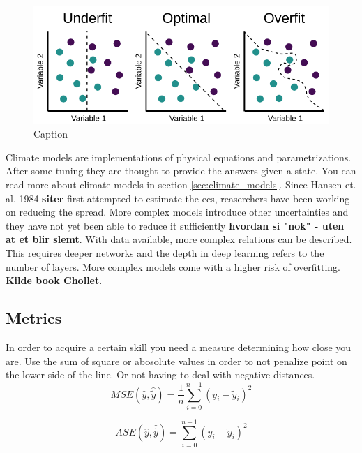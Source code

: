 



\begin{figure}
    \centering
    \includegraphics{Chapter2_Theory/images/classification_overfitted.png}
    \caption{Caption}
    \label{fig:classification_overfitting}
\end{figure}

Climate models are implementations of physical equations and parametrizations. After some tuning they are thought to provide the answers given a state. You can read more about climate models in section \ref{sec:climate_models}. Since Hansen et. al. 1984 \textbf{siter} first attempted to estimate the \acrfull{ecs}, reaserchers have been working on reducing the spread. 
More complex models introduce other uncertainties and they have not yet been able to reduce it sufficiently \textbf{hvordan si "nok" - uten at et blir slemt}. With data available, more complex relations can be described. This requires deeper networks and the depth in deep learning refers to the number of layers. More complex models come with a higher risk of overfitting. \textbf{Kilde book Chollet}.

\subsection{Metrics}  \label{sec:metrics}
In order to acquire a certain skill you need a measure determining how close you are. 
Use the sum of square or abosolute values in order to not penalize point on the lower side of the line. Or not having to deal with negative distances. 
\begin{equation} \label{eq:mse}
    MSE(\hat{y},\hat{\tilde{y}}) = \frac{1}{n} \sum_{i=0}^{n-1}(y_i-\tilde{y}_i)^2
\end{equation} 

\begin{equation} \label{eq:ase}
    ASE(\hat{y},\hat{\tilde{y}}) =  \sum_{i=0}^{n-1}(y_i-\tilde{y}_i)^2
\end{equation} 

